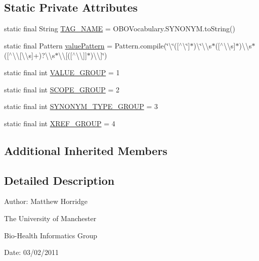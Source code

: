 \subsection*{Static Private Attributes}
\begin{DoxyCompactItemize}
\item 
static final String \hyperlink{classorg_1_1coode_1_1owlapi_1_1obo_1_1parser_1_1_synonym_tag_value_handler_a99f03f6aec50622d32483163a0c23bff}{T\-A\-G\-\_\-\-N\-A\-M\-E} = O\-B\-O\-Vocabulary.\-S\-Y\-N\-O\-N\-Y\-M.\-to\-String()
\item 
static final Pattern \hyperlink{classorg_1_1coode_1_1owlapi_1_1obo_1_1parser_1_1_synonym_tag_value_handler_a98c2b94399a8dbd8f6fa68ea0d3d7d31}{value\-Pattern} = Pattern.\-compile(\char`\"{}\textbackslash{}\char`\"{}(\mbox{[}$^\wedge$\textbackslash{}\char`\"{}\mbox{]}$\ast$)\textbackslash{}\char`\"{}\textbackslash{}\textbackslash{}s$\ast$(\mbox{[}$^\wedge$\textbackslash{}\textbackslash{}s\mbox{]}$\ast$)\textbackslash{}\textbackslash{}s$\ast$(\mbox{[}$^\wedge$\textbackslash{}\textbackslash{}\mbox{[}\textbackslash{}\textbackslash{}s\mbox{]}+)?\textbackslash{}\textbackslash{}s$\ast$\textbackslash{}\textbackslash{}\mbox{[}(\mbox{[}$^\wedge$\textbackslash{}\textbackslash{}\mbox{]}\mbox{]}$\ast$)\textbackslash{}\textbackslash{}\mbox{]}\char`\"{})
\item 
static final int \hyperlink{classorg_1_1coode_1_1owlapi_1_1obo_1_1parser_1_1_synonym_tag_value_handler_a8969c4a717a326d828b467c0a3d08365}{V\-A\-L\-U\-E\-\_\-\-G\-R\-O\-U\-P} = 1
\item 
static final int \hyperlink{classorg_1_1coode_1_1owlapi_1_1obo_1_1parser_1_1_synonym_tag_value_handler_a045842482f10e39e7844b2f787b9d415}{S\-C\-O\-P\-E\-\_\-\-G\-R\-O\-U\-P} = 2
\item 
static final int \hyperlink{classorg_1_1coode_1_1owlapi_1_1obo_1_1parser_1_1_synonym_tag_value_handler_a74b3b0f4476867ebc99468a42e7bcdc7}{S\-Y\-N\-O\-N\-Y\-M\-\_\-\-T\-Y\-P\-E\-\_\-\-G\-R\-O\-U\-P} = 3
\item 
static final int \hyperlink{classorg_1_1coode_1_1owlapi_1_1obo_1_1parser_1_1_synonym_tag_value_handler_a8157f2a65073ab74daedb7e8ce33e3d7}{X\-R\-E\-F\-\_\-\-G\-R\-O\-U\-P} = 4
\end{DoxyCompactItemize}
\subsection*{Additional Inherited Members}


\subsection{Detailed Description}
Author\-: Matthew Horridge\par
 The University of Manchester\par
 Bio-\/\-Health Informatics Group\par
 Date\-: 03/02/2011 

